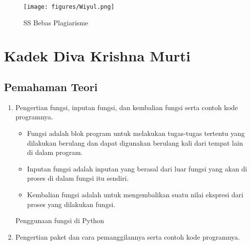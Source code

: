 \begin{figure}[!Htbp]
\centering
\texttt{[image: figures/Wiyul.png]}
\caption{SS Bebas Plagiarisme}
\label{dwiyul}
\end{figure}
\section{Kadek Diva Krishna Murti}
\subsection{Pemahaman Teori}
\begin{enumerate}
	
	\item Pengertian fungsi, inputan fungsi, dan kembalian fungsi serta contoh kode programnya.
	
	\begin{itemize}
		
		\item Fungsi adalah blok program untuk melakukan tugas-tugas tertentu yang dilakukan berulang dan dapat digunakan berulang kali dari tempat lain di dalam program.
		
		
		\item Inputan fungsi adalah inputan yang berasal dari luar fungsi yang akan di proses di dalam fungsi itu sendiri.
		
		
		\item Kembalian fungsi adalah untuk mengembalikan suatu nilai ekspresi dari proses yang dilakukan fungsi.
		
		
	\end{itemize}
	
	Penggunaan fungsi di Python
	
	
	\item Pengertian paket dan cara pemanggilannya serta contoh kode programnya.
	

\end{enumerate}
